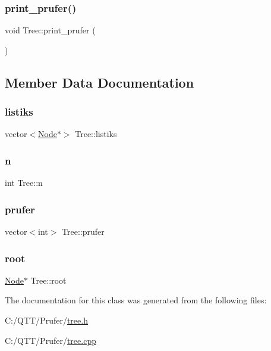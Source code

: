 \mbox{\label{class_tree_a5b7c6c2e01f8787b9ce3fb1684fc847b}} 
\subsubsection{\texorpdfstring{print\+\_\+prufer()}{print\_prufer()}}
{\footnotesize\ttfamily void Tree\+::print\+\_\+prufer (\begin{DoxyParamCaption}{ }\end{DoxyParamCaption})}



\subsection{Member Data Documentation}
\mbox{\label{class_tree_ab4f6271eb3d30383287bbb634b90e3b5}} 
\subsubsection{\texorpdfstring{listiks}{listiks}}
{\footnotesize\ttfamily vector$<$\mbox{\hyperlink{class_node}{Node}}$\ast$$>$ Tree\+::listiks}

\mbox{\label{class_tree_af99cb1765b0249e5d79541313199786c}} 
\subsubsection{\texorpdfstring{n}{n}}
{\footnotesize\ttfamily int Tree\+::n}

\mbox{\label{class_tree_ac173ac7a6fb3d48b0c2226ec848966ee}} 
\subsubsection{\texorpdfstring{prufer}{prufer}}
{\footnotesize\ttfamily vector$<$int$>$ Tree\+::prufer}

\mbox{\label{class_tree_ad8e46ce0aead5778cbdd784d1e370d5f}} 
\subsubsection{\texorpdfstring{root}{root}}
{\footnotesize\ttfamily \mbox{\hyperlink{class_node}{Node}}$\ast$ Tree\+::root}



The documentation for this class was generated from the following files\+:\begin{DoxyCompactItemize}
\item 
C\+:/\+Q\+T\+T/\+Prufer/\mbox{\hyperlink{tree_8h}{tree.\+h}}\item 
C\+:/\+Q\+T\+T/\+Prufer/\mbox{\hyperlink{tree_8cpp}{tree.\+cpp}}\end{DoxyCompactItemize}
